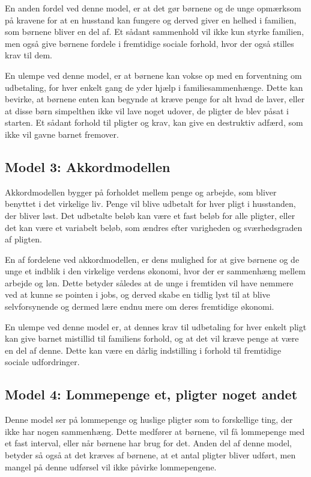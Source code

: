 En anden fordel ved denne model, er at det gør 
børnene og de unge opmærksom på kravene for at 
en husstand kan fungere og derved giver en 
helhed i familien, som børnene bliver en del af. 
Et sådant sammenhold vil ikke kun styrke 
familien, men også give børnene fordele 
i fremtidige sociale forhold, hvor der også 
stilles krav til dem.

En ulempe ved denne model, er at børnene kan 
vokse op med en forventning om udbetaling, for 
hver enkelt gang de yder hjælp i 
familiesammenhænge. Dette kan bevirke, at børnene 
enten kan begynde at kræve penge for alt hvad de 
laver, eller at disse børn simpelthen ikke vil 
lave noget udover, de pligter de blev påsat i 
starten. Et sådant forhold til pligter og krav, 
kan give en destruktiv adfærd, som ikke vil 
gavne barnet fremover.

\subsection{Model 3: Akkordmodellen}
Akkordmodellen bygger på forholdet mellem penge 
og arbejde, som bliver benyttet i det 
virkelige liv. Penge vil blive udbetalt for 
hver pligt i husstanden, der bliver løst. 
Det udbetalte beløb kan være et fast beløb 
for alle pligter, eller det kan være et 
variabelt beløb, som ændres efter varigheden
og sværhedsgraden af pligten.

En af fordelene ved akkordmodellen, er dens 
mulighed for at give børnene og de unge et 
indblik i den virkelige verdens økonomi, hvor 
der er sammenhæng mellem arbejde og løn. Dette 
betyder således at de unge i fremtiden vil have 
nemmere ved at kunne se pointen i jobs, og 
derved skabe en tidlig lyst til at blive 
selvforsynende og dermed lære endnu mere om 
deres fremtidige økonomi.

En ulempe ved denne model er, at dennes krav til 
udbetaling for hver enkelt pligt kan give 
barnet mistillid til familiens forhold, og at 
det vil kræve penge at være en del af denne. 
Dette kan være en dårlig indstilling i forhold til 
fremtidige sociale udfordringer.

\subsection{Model 4: Lommepenge et, pligter 
noget andet}
Denne model ser på lommepenge og huslige pligter 
som to forskellige ting, der ikke har 
nogen sammenhæng. Dette medfører at 
børnene, vil få lommepenge med et fast interval, 
eller når børnene har brug for det. Anden del af 
denne model, betyder så også at det kræves af 
børnene, at et antal pligter bliver udført, men 
mangel på denne udførsel vil ikke påvirke 
lommepengene.

